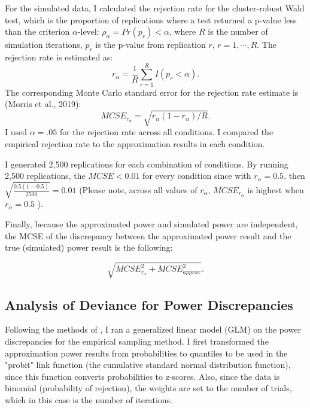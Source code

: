 For the simulated data, I calculated the rejection rate for the cluster-robust Wald test, which is the proportion of replications where a test returned a p-value less than the criterion $\alpha$-level: $\rho_{\alpha} = Pr(p_r) < \alpha$, where $R$ is the number of simulation iterations, $p_r$ is the p-value from replication $r$, $r = 1, \cdots, R$. The rejection rate is estimated as:
\begin{equation}
    r_{\alpha} = \frac{1}{R} \sum_{r=1}^R I(p_r < \alpha).
\end{equation}
The corresponding Monte Carlo standard error for the rejection rate estimate is (Morris et al., 2019):
\begin{equation}
    MCSE_{r_{\alpha}} = \sqrt{r_{\alpha}(1-r_{\alpha})/R}.
\end{equation}
I used $\alpha = .05$ for the rejection rate across all conditions. I compared the empirical rejection rate to the approximation results in each condition.

I generated 2,500 replications for each combination of conditions. By running 2,500 replications, the $MCSE < 0.01$ for every condition since with $r_{\alpha} = 0.5$, then $\sqrt{\frac{0.5(1-0.5)}{2500}} = 0.01$ (Please note, across all values of $r_{\alpha}$,  $ MCSE_{r_{\alpha}}$ is highest when $r_{\alpha} = 0.5$ ). 


Finally, because the approximated power and simulated power are independent, the MCSE of the discrepancy between the approximated power result and the true (simulated) power result is the following:

\begin{equation}
    \sqrt{MCSE_{r_{\alpha}}^2 + MCSE_{approx}^2}.
\end{equation}


\subsection{Analysis of Deviance for Power Discrepancies} \label{sec: analysis of deviance}

Following the methods of \textcite{vembye2023}, I ran a generalized linear model (GLM) on the power discrepancies for the empirical sampling method. I first transformed the approximation power results from probabilities to quantiles to be used in the "probit" link function (the cumulative standard normal distribution function), since this function converts probabilities to z-scores. Also, since the data is binomial (probability of rejection), the weights are set to the number of trials, which in this case is the number of iterations.  

